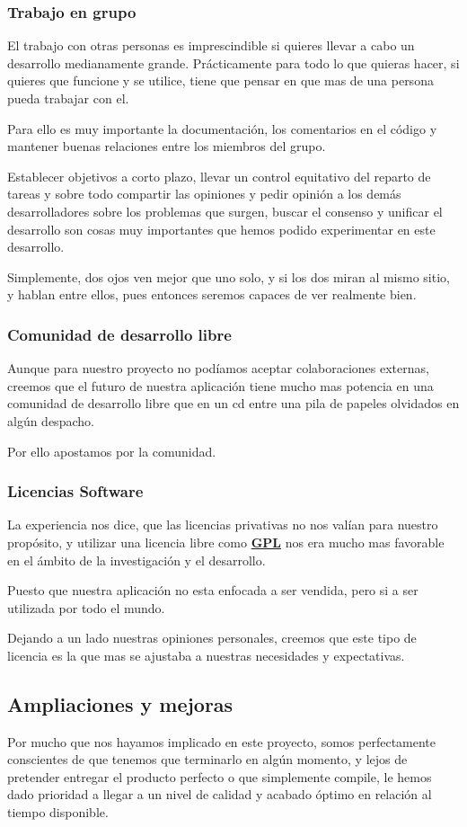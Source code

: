 \subsubsection*{Trabajo en grupo}
El trabajo con otras personas es imprescindible si quieres llevar a cabo un
desarrollo medianamente grande. Prácticamente para todo lo que quieras hacer,
si quieres que funcione y se utilice, tiene que pensar en que mas de una
persona pueda trabajar con el.

Para ello es muy importante la documentación, los comentarios en el código y
mantener buenas relaciones entre los miembros del grupo.

Establecer objetivos a corto plazo, llevar un control equitativo del reparto de
tareas y sobre todo compartir las opiniones y pedir opinión a los demás
desarrolladores sobre los problemas que surgen, buscar el consenso y
unificar el desarrollo son cosas muy importantes que hemos podido experimentar
en este desarrollo.

Simplemente, dos ojos ven mejor que uno solo, y si los dos miran al mismo
sitio, y hablan entre ellos, pues entonces seremos capaces de ver realmente
bien.
\subsubsection*{Comunidad de desarrollo libre}
Aunque para nuestro proyecto no podíamos aceptar colaboraciones externas,
creemos que el futuro de nuestra aplicación tiene mucho mas potencia en una
comunidad de desarrollo libre que en un cd entre una pila de papeles olvidados
en algún despacho.

Por ello apostamos por la comunidad.
\subsubsection*{Licencias Software}
La experiencia nos dice, que las licencias privativas no nos valían para
nuestro propósito, y utilizar una licencia libre como \hyperref[ap1]{\bf
GPL} nos era mucho mas
favorable en el ámbito de la investigación y el desarrollo.

Puesto que nuestra aplicación no esta enfocada a ser vendida, pero si a ser
utilizada por todo el mundo.

Dejando a un lado nuestras opiniones personales, creemos que este tipo de
licencia es la que mas se ajustaba a nuestras necesidades y expectativas.
\subsection*{Ampliaciones y mejoras}
Por  mucho que nos hayamos implicado en este proyecto, somos perfectamente
conscientes de que tenemos que terminarlo en algún momento, y lejos de
pretender entregar el producto perfecto o que simplemente compile, le hemos
dado prioridad a llegar a un nivel de calidad y acabado óptimo en relación al
tiempo disponible.

